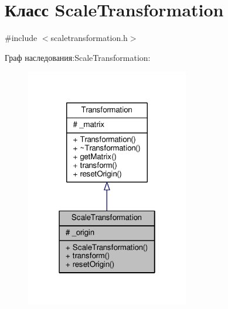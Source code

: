 \hypertarget{class_scale_transformation}{}\section{Класс Scale\+Transformation}
\label{class_scale_transformation}


{\ttfamily \#include $<$scaletransformation.\+h$>$}



Граф наследования\+:Scale\+Transformation\+:
\nopagebreak
\begin{figure}[H]
\begin{center}
\leavevmode
\includegraphics[width=202pt]{dd/dcf/class_scale_transformation__inherit__graph}
\end{center}
\end{figure}


